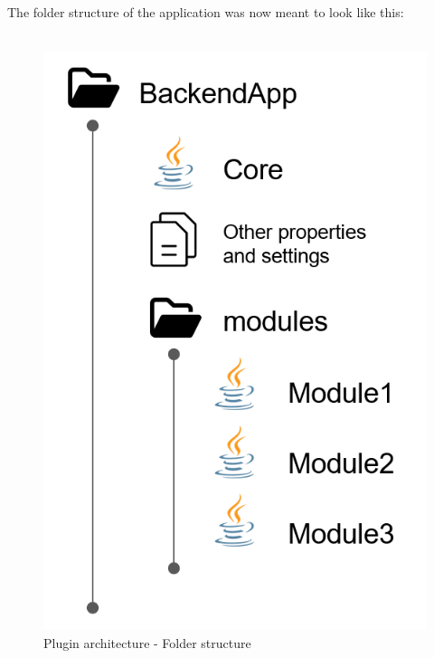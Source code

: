 \noindent The folder structure of the application was now meant to look like this:
\\\\
\begin{figure}[h]
    \centering
    \includegraphics[scale=0.5]{images/plugin-folder-structure.png}
    \caption{Plugin architecture - Folder structure}
    \label{fig:figure1}
\end{figure}

